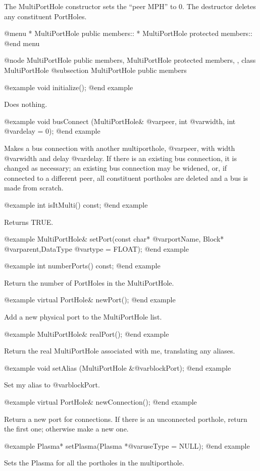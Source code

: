 The MultiPortHole constructor sets the ``peer MPH'' to 0.  The destructor
deletes any constituent PortHoles.

@menu
* MultiPortHole public members::  
* MultiPortHole protected members::  
@end menu

@node MultiPortHole public members, MultiPortHole protected members,  , class MultiPortHole
@subsection MultiPortHole public members

@example
void initialize();
@end example

Does nothing.

@example
void busConnect (MultiPortHole& @var{peer}, int @var{width}, int @var{delay} = 0);
@end example

Makes a bus connection with another multiporthole, @var{peer}, with
width @var{width} and delay @var{delay}.  If there is an existing bus
connection, it is changed as necessary; an existing bus connection may
be widened, or, if connected to a different peer, all constituent
portholes are deleted and a bus is made from scratch.

@example
int isItMulti() const;
@end example

Returns TRUE.

@example
MultiPortHole& setPort(const char* @var{portName},
                       Block* @var{parent},DataType @var{type} = FLOAT);
@end example

@example
int numberPorts() const;
@end example

Return the number of PortHoles in the MultiPortHole.

@example
virtual PortHole& newPort();
@end example

Add a new physical port to the MultiPortHole list.

@example
MultiPortHole& realPort();
@end example

Return the real MultiPortHole associated with me, translating any
aliases.

@example
void setAlias (MultiPortHole &@var{blockPort});
@end example

Set my alias to @var{blockPort}.

@example
virtual PortHole& newConnection();
@end example

Return a new port for connections.  If there is an unconnected porthole,
return the first one; otherwise make a new one.

@example
Plasma* setPlasma(Plasma *@var{useType} = NULL);
@end example

Sets the Plasma for all the portholes in the multiporthole.

